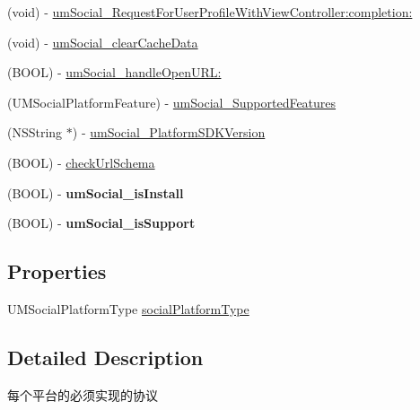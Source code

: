 \begin{DoxyCompactItemize}
\item 
(void) -\/ \mbox{\hyperlink{protocol_u_m_social_platform_provider_01-p_a19f829db2b2d3c83f332556b3685e411}{um\+Social\+\_\+\+Request\+For\+User\+Profile\+With\+View\+Controller\+:completion\+:}}
\item 
(void) -\/ \mbox{\hyperlink{protocol_u_m_social_platform_provider_01-p_a0ed5acc40aa41283f7e5fb5a1ef7faa8}{um\+Social\+\_\+clear\+Cache\+Data}}
\item 
(B\+O\+OL) -\/ \mbox{\hyperlink{protocol_u_m_social_platform_provider_01-p_a5076903efac29b14aa957259fa554bd2}{um\+Social\+\_\+handle\+Open\+U\+R\+L\+:}}
\item 
(U\+M\+Social\+Platform\+Feature) -\/ \mbox{\hyperlink{protocol_u_m_social_platform_provider_01-p_a76d1a85244d9f7d3407197fa8fcee200}{um\+Social\+\_\+\+Supported\+Features}}
\item 
(N\+S\+String $\ast$) -\/ \mbox{\hyperlink{protocol_u_m_social_platform_provider_01-p_a03a01c52bd5f6689bf20c35760a4460b}{um\+Social\+\_\+\+Platform\+S\+D\+K\+Version}}
\item 
(B\+O\+OL) -\/ \mbox{\hyperlink{protocol_u_m_social_platform_provider_01-p_ac3636541b3af7e39f583e8766613b11c}{check\+Url\+Schema}}
\item 
\mbox{\label{protocol_u_m_social_platform_provider_01-p_a86b82bfde78b6b28009259a497d331de}} 
(B\+O\+OL) -\/ {\bfseries um\+Social\+\_\+is\+Install}
\item 
\mbox{\label{protocol_u_m_social_platform_provider_01-p_a16050bc0dcf6823beea2ace63eb64052}} 
(B\+O\+OL) -\/ {\bfseries um\+Social\+\_\+is\+Support}
\end{DoxyCompactItemize}
\subsection*{Properties}
\begin{DoxyCompactItemize}
\item 
U\+M\+Social\+Platform\+Type \mbox{\hyperlink{protocol_u_m_social_platform_provider_01-p_aeef1b5d6a8e23f26893298b5f2ce0deb}{social\+Platform\+Type}}
\end{DoxyCompactItemize}


\subsection{Detailed Description}
每个平台的必须实现的协议 


